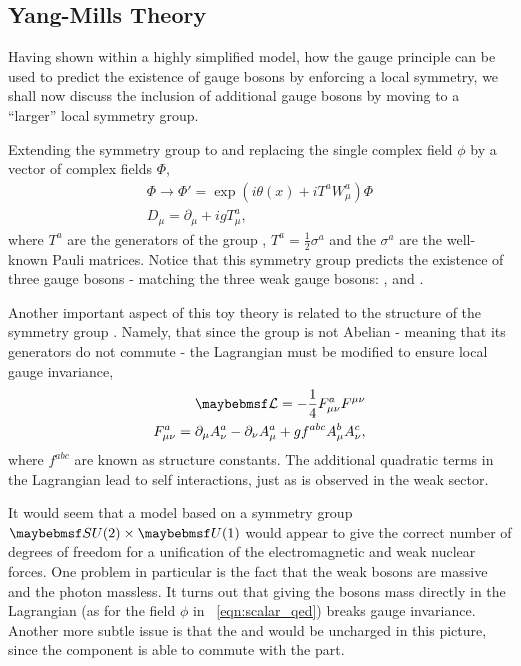 \subsection{Yang-Mills Theory}
Having shown within a highly simplified model, how the gauge principle can be
used to predict the existence of gauge bosons by enforcing a local symmetry, we
shall now discuss the inclusion of additional gauge bosons by moving to a
``larger'' local symmetry group.

Extending the symmetry group to \SUtwo and replacing the single complex field
$\phi$ by a vector of complex fields $\Phi$,
\begin{eqnarray*}
\Phi \longrightarrow \Phi' = \exp\left(i\theta(x) + iT^a W^a_{\mu}\right)\Phi\\
D_{\mu} = \partial_{\mu} + igT^a_{\mu},
\end{eqnarray*}
where $T^a$ are the generators of the group \SUtwo, $T^a = \frac{1}{2}\sigma^a$
and the $\sigma^a$ are the well-known Pauli matrices. Notice that this symmetry
group predicts the existence of three gauge bosons - matching the three weak
gauge bosons: \PZ, \PWp and \PWm.

Another important aspect of this toy theory is related to the structure of the
symmetry group \SUtwo. Namely, that since the group is not Abelian - meaning
that its generators do not commute - the Lagrangian must be modified to ensure
local gauge invariance,
\begin{eqnarray*}
\lagrangiand = -\frac{1}{4}F^a_{\mu\nu}F^{\mu\nu} \\
F^a_{\mu\nu} = \partial_{\mu} A^a_{\nu} - \partial_{\nu} A^a_{\mu} + g f^{abc}
A^b_{\mu} A^c_{\nu},
\end{eqnarray*}
where $f^{abc}$ are known as structure constants. The additional quadratic terms
in the Lagrangian lead to self interactions, just as is observed in the weak
sector.

It would seem that a model based on a symmetry group $\SUtwo\times\Uone$ would
appear to give the correct number of degrees of freedom for a unification of the
electromagnetic and weak nuclear forces. One problem in particular is the fact
that the weak bosons are massive and the photon massless. It turns out that
giving the bosons mass directly in the Lagrangian (as for the field $\phi$ in
\eqn~\ref{eqn:scalar_qed}) breaks gauge invariance. Another more subtle
issue is that the \PWp and \PWm would be uncharged in this picture, since the
\SUtwo component is able to commute with the \Uone part.

